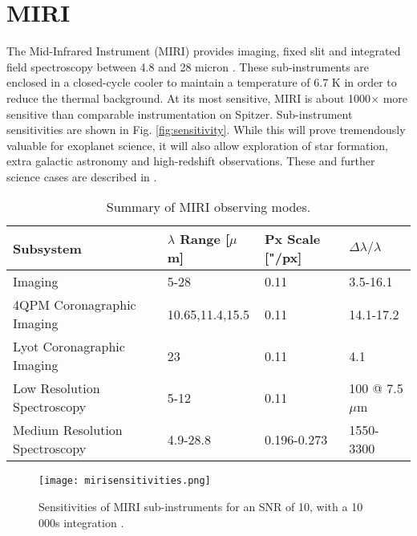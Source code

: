 \section{MIRI}
The Mid-Infrared Instrument (MIRI) provides imaging, fixed slit and integrated field spectroscopy between 4.8 and 28 micron \parencite{MIRI2}.
These sub-instruments are enclosed in a closed-cycle cooler to maintain a temperature of 6.7 K in order to reduce the thermal background.
At its most sensitive, MIRI is about 1000$\times$ more sensitive than comparable instrumentation on Spitzer. 
Sub-instrument sensitivities are shown in Fig. \ref{fig:sensitivity}.
While this will prove tremendously valuable for exoplanet science, it will also allow exploration of star formation, extra galactic astronomy and high-redshift observations. 
These and further science cases are described in \parencite{MIRI1}. 

\begin{table}[t]
	\begin{footnotesize}
	\centering
	\begin{tabular}{l|lll}
		\toprule
		\textbf{Subsystem} & \textbf{$\lambda$ Range [$\mu$m]} & \textbf{Px Scale ["/px]} & $\Delta\lambda/\lambda$\\
		\midrule
		Imaging & 5-28 & 0.11 & 3.5-16.1\\
		4QPM Coronagraphic Imaging & 10.65,11.4,15.5 & 0.11 & 14.1-17.2\\
		Lyot Coronagraphic Imaging & 23 & 0.11 & 4.1\\
		Low Resolution Spectroscopy & 5-12 & 0.11 & 100 @ 7.5$\mu$m\\
		Medium Resolution Spectroscopy & 4.9-28.8 & 0.196-0.273 & 1550-3300 \\
		\bottomrule
	\end{tabular}
	\caption{Summary of MIRI observing modes.}
	\label{tab:mirimodes}
	\end{footnotesize}
\end{table}
\begin{figure}[h]
	\centering
	\texttt{[image: mirisensitivities.png]}
	\caption{Sensitivities of MIRI sub-instruments for an SNR of 10, with a 10 000s integration \parencite{MIRI1}.}
	\label{fig:sensitivities}
\end{figure}
